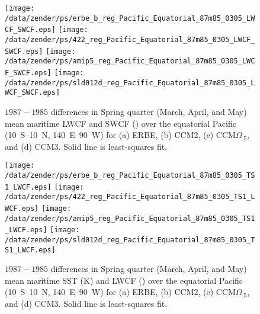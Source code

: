 \documentclass[twocolumn,final,11pt]{article}
\begin{document}
\begin{sidewaysfigure}
\begin{center}
\texttt{[image: /data/zender/ps/erbe\_b\_reg\_Pacific\_Equatorial\_87m85\_0305\_LWCF\_SWCF.eps]}%
\texttt{[image: /data/zender/ps/422\_reg\_Pacific\_Equatorial\_87m85\_0305\_LWCF\_SWCF.eps]}%
\texttt{[image: /data/zender/ps/amip5\_reg\_Pacific\_Equatorial\_87m85\_0305\_LWCF\_SWCF.eps]}%
\texttt{[image: /data/zender/ps/sld012d\_reg\_Pacific\_Equatorial\_87m85\_0305\_LWCF\_SWCF.eps]}%
\end{center}
\caption[$1987-1985$ differences in Spring quarter (March, April, and
May) mean maritime LWCF and SWCF over the equatorial Pacific for ERBE,
CCM2, CCM$\Omega_{.5}$, and CCM3]{ 
$1987-1985$ differences in Spring quarter (March, April, and May) 
mean maritime LWCF and SWCF (\wxmS) over the equatorial Pacific 
(10~\degreee S--10~\degreee N, 140~\degreee E--90~\degreee W)
for (a) ERBE, (b) CCM2, (c) CCM$\Omega_{.5}$, and (d) CCM3.
Solid line is least-squares fit.
\label{fig:reg_Pacific_Equatorial_87m85_0305_LWCF_SWCF}}   
\end{sidewaysfigure}

\begin{sidewaysfigure}
\begin{center}
\texttt{[image: /data/zender/ps/erbe\_b\_reg\_Pacific\_Equatorial\_87m85\_0305\_TS1\_LWCF.eps]}%
\texttt{[image: /data/zender/ps/422\_reg\_Pacific\_Equatorial\_87m85\_0305\_TS1\_LWCF.eps]}%
\texttt{[image: /data/zender/ps/amip5\_reg\_Pacific\_Equatorial\_87m85\_0305\_TS1\_LWCF.eps]}%
\texttt{[image: /data/zender/ps/sld012d\_reg\_Pacific\_Equatorial\_87m85\_0305\_TS1\_LWCF.eps]}%
\end{center}
\caption[$1987-1985$ differences in Spring quarter (March, April, and May)
mean maritime SST and LWCF over the equatorial Pacific for ERBE, CCM2, CCM$\Omega_{.5}$,
and CCM3]{ 
$1987-1985$ differences in Spring quarter (March, April, and May)
mean maritime SST (\degreee K) and LWCF (\wxmS) over the equatorial
Pacific  (10~\degreee S--10~\degreee N, 140~\degreee E--90~\degreee W)
for (a) ERBE, (b) CCM2, (c) CCM$\Omega_{.5}$, and (d) CCM3.
Solid line is least-squares fit.
\label{fig:reg_Pacific_Equatorial_87m85_0305_TS1_LWCF}}   
\end{sidewaysfigure}
\end{document}
